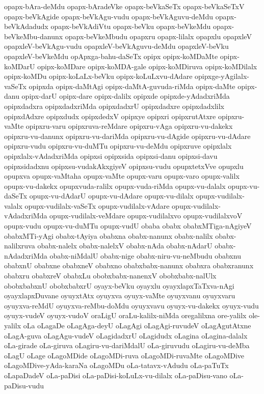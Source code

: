 {opapx-bAra-deMdu
opapx-bAradeVke
opapx-beVkaSeTx
opapx-beVkaSeTxV
opapx-beVkAgide
opapx-beVkAgu-vudu
opapx-beVkAguvu-deMdu
opapx-beVkAdadudx
opapx-beVkAdiVtu
opapx-beVku
opapx-beVkeMdu
opapx-beVkeMbu-danunx
opapx-beVkeMbudu
opapxru
opapx-lilalx
opapxlu
opapxleV
opapxleV-beVkAgu-vudu
opapxleV-beVkAguvu-deMdu
opapxleV-beVku
opapxleV-beVkeMdu
opApxga-bahu-daSeTx
opipx
opipx-koMDaMte
opipx-koMDarU
opipx-koMDare
opipx-koMDA-gale
opipx-koMDiruva
opipx-koMDilalx
opipx-koMDu
opipx-koLaLx-beVku
opipx-koLuLxvu-dAdare
opipxge-yAgilalx-vaSeTx
opipxda
opipx-daMtAgi
opipx-daMtA-guvuda-riMda
opipx-daMte
opipx-danu
opipx-darU
opipx-dare
opipx-dalilx
opipxde
opipxde-yAdadxriMda
opipxdadxra
opipxdadxriMda
opipxdadxrU
opipxdadxre
opipxdadxlilx
opipxdAdxre
opipxdudx
opipxdedxV
opipxye
opipxri
opipxrutAtxre
opipxru-vaMte
opipxru-varu
opipxruva-reMdare
opipxru-vAga
opipxru-vu-dakekx
opipxru-vu-danunx
opipxru-vu-dariMda
opipxru-vu-dAgide
opipxru-vu-dAdare
opipxru-vudu
opipxru-vu-duMTu
opipxru-vu-deMdu
opipxruve
opipxlalx
opipxlalx-vAdadxriMda
opipxsi
opipxsida
opipxsi-danu
opipxsi-davu
opipxsidadxnu
opipxsu-vudakAkxgiyeV
opipxsu-vudu
opupxtetxVve
opupxlu
opupxva
opupx-vaMtaha
opupx-vaMte
opupx-varu
opupx-varo
opupx-valilx
opupx-vu-dakekx
opupxvuda-ralilx
opupx-vuda-riMda
opupx-vu-dalalx
opupx-vu-daSeTx
opupx-vu-dAdarU
opupx-vu-dAdare
opupx-vu-dilalx
opupx-vudilalx-valalx
opupx-vudilalx-vaSeTx
opupx-vudilalx-vAdare
opupx-vudilalx-vAdadxriMda
opupx-vudilalx-veMdare
opupx-vudilalxvo
opupx-vudilalxvoV
opupx-vudu
opupx-vu-duMTu
opupx-vudU
obaba
obabx
obabxMTiga-nAgiyeV
obabxMTi-yAgi
obabx-tAyiya
obabxna
obabx-nanunx
obabx-nalilx
obabx-nalilxruva
obabx-nalelx
obabx-nalelxV
obabx-nAda
obabx-nAdarU
obabx-nAdadxriMda
obabx-niMdalU
obabx-nige
obabx-niru-vu-neMbudu
obabxnu
obabxnU
obabxne
obabxneV
obabxno
obabxbabx-nanunx
obabxra
obabxranunx
obabxru
obabxreV
obabxLu
obobxbabx-nanenxV
obobxbabx-nalUlx
obobxbabxnU
obobxbabxrU
oyayx-beVku
oyayxlu
oyayxlapxTaTxva-nAgi
oyayxlapxDuvane
oyuyxtAtx
oyuyxva
oyuyx-vaMte
oyuyxvanu
oyuyxvaru
oyuyxva-reMdU
oyuyxva-reMbu-doMdu
oyuyxvavu
oyuyx-vu-dakekx
oyuyx-vudu
oyuyx-vudeV
oyuyx-vudoV
oraLigU
oraLu-kalilx-niMda
oregalilxna
ore-yalilx
ole-yalilx
oLa
oLagaDe
oLagAga-deyU
oLagAgi
oLagAgi-ruvudeV
oLagAgutAtxne
oLagA-guva
oLagAgu-vudeV
oLagidadxrU
oLagidudx
oLagina
oLagina-dalalx
oLa-girade
oLa-giruva
oLagiru-vu-dariMdalU
oLa-giruvudu
oLagiru-vu-deMba
oLagU
oLage
oLagoMDide
oLagoMDi-ruva
oLagoMDi-ruvaMte
oLagoMDive
oLagoMDive-yAda-karaNa
oLagoMDu
oLa-tatavx-vAdudu
oLa-paTuTx
oLapaDadeV
oLa-paDisi
oLa-paDisi-koLuLx-vu-dilalx
oLa-paDisu-vano
oLa-paDisu-vudu
}
